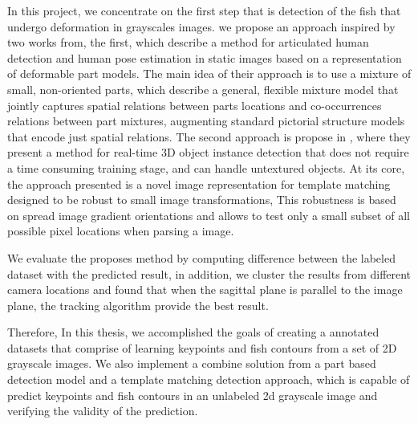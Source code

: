 In this project, we concentrate on the first step that is detection of the fish 
that undergo deformation in grayscales images. we propose an approach inspired by 
two works from, the first, 
\citet{ramanan2012} which describe a method for articulated human detection
and human pose estimation in static images based on a representation of deformable 
part models. The main idea of their approach is to use a mixture of small, non-oriented 
parts, which describe a general, flexible mixture model that jointly captures spatial 
relations between parts locations and co-occurrences relations between part mixtures, 
augmenting standard pictorial structure models that encode just spatial relations. 
The second approach is propose in \citet{Hinterstoisser2012}, where they present 
a method for real-time 3D object instance detection that does not require a time 
consuming training stage, and can handle untextured objects. At its core, the approach 
presented is a novel image representation for template matching designed to be robust 
to small image transformations, This robustness is based on spread image gradient 
orientations and allows to test only a small subset of all possible pixel locations 
when parsing a image.

We evaluate the proposes method by computing difference between the labeled dataset
with the predicted result, in addition, we cluster the results from different 
camera locations and found that when the sagittal plane is parallel to the image plane,
the tracking algorithm provide the best result.

Therefore, In this thesis, we accomplished  the goals of creating a annotated datasets that
comprise of learning keypoints and fish contours from a set of 2D grayscale images.
We also implement a combine solution from a part based detection model and a template
matching detection approach, which is capable of predict keypoints and fish contours in an 
unlabeled 2d grayscale image and verifying the validity of the prediction.
